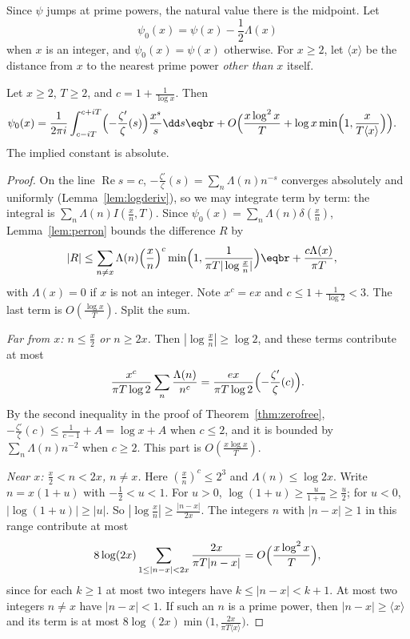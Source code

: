 Since $\psi$ jumps at prime powers, the natural value there is the midpoint. Let
\[
\psi_0(x)=\psi(x)-\frac12\Lambda(x)
\]
when $x$ is an integer, and $\psi_0(x)=\psi(x)$ otherwise. For $x\ge2$, let $\langle x\rangle$ be the distance from $x$ to the nearest prime power \emph{other than} $x$ itself.

\begin{proposition}\label{prop:truncperron}
Let $x\ge2$, $T\ge2$, and $c=1+\frac1{\log x}$. Then
\[
\begin{aligned}\psi_0(x)&=\frac1{2\pi i}\int_{c-iT}^{c+iT}\Bigl(-\frac{\zeta'}\zeta(s)\Bigr)\frac{x^s}s\dd s\eqbr+O\Bigl(\frac{x\log^2x}T+\log x\min\Bigl(1,\frac x{T\langle x\rangle}\Bigr)\Bigr).\end{aligned}
\]
The implied constant is absolute.
\end{proposition}
\begin{proof}
On the line $\operatorname{Re}s=c$, $-\frac{\zeta'}\zeta(s)=\sum_n\Lambda(n)n^{-s}$ converges absolutely and uniformly (Lemma~\ref{lem:logderiv}), so we may integrate term by term:
the integral is $\sum_n\Lambda(n)I(\frac xn,T)$. Since $\psi_0(x)=\sum_n\Lambda(n)\delta(\frac xn)$, Lemma~\ref{lem:perron} bounds the difference $R$ by
\[
\begin{aligned}|R|&\le\sum_{n\ne x}\Lambda(n)\Bigl(\frac xn\Bigr)^c\min\Bigl(1,\frac1{\pi T|\log\frac xn|}\Bigr)\eqbr+\frac{c\Lambda(x)}{\pi T},\end{aligned}
\]
with $\Lambda(x)=0$ if $x$ is not an integer. Note $x^c=ex$ and $c\le1+\frac1{\log2}<3$. The last term is $O(\frac{\log x}T)$. Split the sum.

\emph{Far from $x$: $n\le\frac x2$ or $n\ge2x$.} Then $|\log\frac xn|\ge\log2$, and these terms contribute at most
\[
\frac{x^c}{\pi T\log2}\sum_n\frac{\Lambda(n)}{n^c}=\frac{ex}{\pi T\log2}\Bigl(-\frac{\zeta'}\zeta(c)\Bigr).
\]
By the second inequality in the proof of Theorem~\ref{thm:zerofree}, $-\frac{\zeta'}\zeta(c)\le\frac1{c-1}+A=\log x+A$ when $c\le2$, and it is bounded by $\sum_n\Lambda(n)n^{-2}$ when $c\ge2$. This part is $O(\frac{x\log x}T)$.

\emph{Near $x$: $\frac x2<n<2x$, $n\ne x$.} Here $(\frac xn)^c\le2^3$ and $\Lambda(n)\le\log2x$. Write $n=x(1+u)$ with $-\frac12<u<1$. For $u>0$, $\log(1+u)\ge\frac u{1+u}\ge\frac u2$; for $u<0$,
$|\log(1+u)|\ge|u|$. So $|\log\frac xn|\ge\frac{|n-x|}{2x}$. The integers $n$ with $|n-x|\ge1$ in this range contribute at most
\[
8\log(2x)\sum_{1\le|n-x|<2x}\frac{2x}{\pi T|n-x|}=O\Bigl(\frac{x\log^2x}T\Bigr),
\]
since for each $k\ge1$ at most two integers have $k\le|n-x|<k+1$. At most two integers $n\ne x$ have $|n-x|<1$. If such an $n$ is a prime power, then $|n-x|\ge\langle x\rangle$ and its term
is at most $8\log(2x)\min\bigl(1,\frac{2x}{\pi T\langle x\rangle}\bigr)$.
\end{proof}

